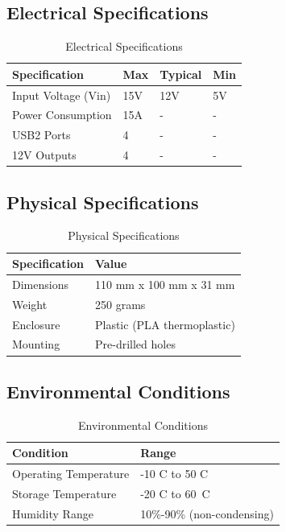 \documentclass[a4paper,10pt,twocolumn]{article}
\begin{document}
\subsection*{Electrical Specifications}
\begin{table}[h]
    \centering
    \begin{tabular}{|l|l|l|l|}
    \hline
    \textbf{Specification} & Max & Typical & Min \\
    \hline
    Input Voltage (Vin) & 15V & 12V & 5V \\
    Power Consumption & 15A & - & - \\
    USB2 Ports & 4 & - & - \\
    12V Outputs & 4 & - & - \\
    \hline
    \end{tabular}
    \caption{Electrical Specifications}
\end{table}

\subsection*{Physical Specifications}
\begin{table}[h]
    \centering
    \begin{tabular}{|l|l|}
    \hline
    \textbf{Specification} & \textbf{Value} \\
    \hline
    Dimensions & 110 mm x 100 mm x 31 mm \\
    Weight & 250 grams \\
    Enclosure & Plastic (PLA thermoplastic) \\
    Mounting & Pre-drilled holes \\
    \hline
    \end{tabular}
    \caption{Physical Specifications}
\end{table}

\subsection*{Environmental Conditions}
\begin{table}[h]
    \centering
    \begin{tabular}{|l|l|}
    \hline
    \textbf{Condition} & \textbf{Range} \\
    \hline
    Operating Temperature & -10 C to 50 C \\
    Storage Temperature & -20 C to 60\ C \\
    Humidity Range & 10\%-90\% (non-condensing) \\
    \hline
    \end{tabular}
    \caption{Environmental Conditions}
\end{table}
\end{document}
